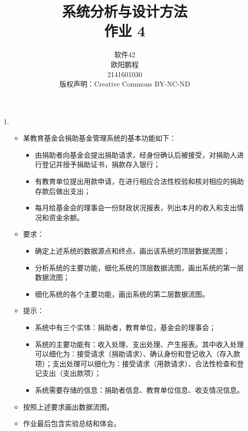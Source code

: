 \documentclass[UTF8]{ctexart}
\title{系统分析与设计方法 \\ 作业 4}
\author{软件42 \\ 欧阳鹏程 \\ 2141601030 \\ 版权声明：Creative Commons BY-NC-ND}
\begin{document}
\maketitle

\begin{enumerate}
	\item 
	\begin{itemize}
		\item 某教育基金会捐助基金管理系统的基本功能如下：
		\begin{itemize}
			\item 由捐助者向基金会提出捐助请求，经身份确认后被接受，对捐助人进行登记并授予捐助证书，捐款存入银行；
			\item 有教育单位提出用款申请，在进行相应合法性校验和核对相应的捐助存款后做出支出；
			\item 每月给基金会的理事会一份财政状况报表，列出本月的收入和支出情况和资金余额。
		\end{itemize}
		\item 要求：
		\begin{itemize}
			\item 确定上述系统的数据源点和终点，画出该系统的顶层数据流图；
			\item 分析系统的主要功能，细化系统的顶层数据流图，画出系统的第一层数据流图；
			\item 细化系统的各个主要功能，画出系统的第二层数据流图。
		\end{itemize}
		\item 提示：
		\begin{itemize}
			\item 系统中有三个实体：捐助者，教育单位，基金会的理事会；
			\item 系统的主要功能有：收入处理、支出处理、产生报表。其中收入处理可以细化为：接受请求（捐助请求）、确认身份和登记收入（存入款项）；支出处理可以细化为：接受请求（用款请求）、合法性检查和登记支出（支出款项）；
			\item 系统需要存储的信息：捐助者信息、教育单位信息、收支情况信息。
		\end{itemize}
		\item 按照上述要求画出数据流图。
		\item 作业最后包含实验总结和体会。
	\end{itemize}
		
\end{enumerate}
\end{document}
